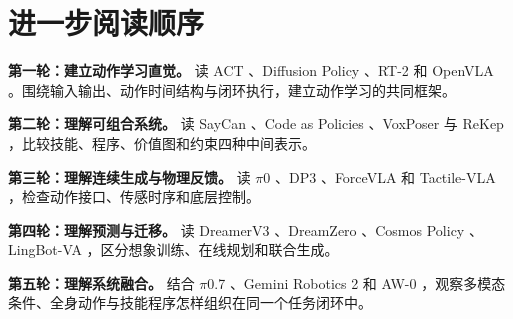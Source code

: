 \documentclass[UTF8,a4paper,11pt,oneside,openany,fontset=none]{ctexbook}
\begin{document}
\chapter{进一步阅读顺序}

\textbf{第一轮：建立动作学习直觉。} 读 ACT \cite{R02}、Diffusion Policy \cite{R03}、RT-2 \cite{R06} 和 OpenVLA \cite{R07}。围绕输入输出、动作时间结构与闭环执行，建立动作学习的共同框架。

\textbf{第二轮：理解可组合系统。} 读 SayCan \cite{R21}、Code as Policies \cite{R22}、VoxPoser \cite{R23} 与 ReKep \cite{R24}，比较技能、程序、价值图和约束四种中间表示。

\textbf{第三轮：理解连续生成与物理反馈。} 读 \(\pi\)0 \cite{R09}、DP3 \cite{R16}、ForceVLA \cite{R18} 和 Tactile-VLA \cite{R19}，检查动作接口、传感时序和底层控制。

\textbf{第四轮：理解预测与迁移。} 读 DreamerV3 \cite{R25}、DreamZero \cite{R27}、Cosmos Policy \cite{R28}、LingBot-VA \cite{R29}，区分想象训练、在线规划和联合生成。

\textbf{第五轮：理解系统融合。} 结合 \(\pi\)0.7 \cite{R12}、Gemini Robotics 2 \cite{R14} 和 AW-0 \cite{R31}，观察多模态条件、全身动作与技能程序怎样组织在同一个任务闭环中。
\end{document}
